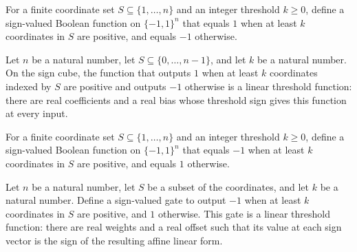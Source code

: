 \begin{definition}
\label{FABL.countThresholdGate}
\leanok
{}
For a finite coordinate set $S\subseteq\{1,\ldots,n\}$ and an integer threshold $k\ge
0$, define a sign-valued Boolean function on $\{−1,1\}^n$ that equals $1$ when at least
$k$ coordinates in $S$ are positive, and equals $−1$ otherwise.
\end{definition}

\begin{theorem}
\label{FABL.countThresholdGate_isLinearThreshold}
\leanok
{}
Let $n$ be a natural number, let $S\subseteq\{0,\ldots,n-1\}$, and let $k$ be a natural
number. On the sign cube, the function that outputs $1$ when at least $k$ coordinates
indexed by $S$ are positive and outputs $-1$ otherwise is a linear threshold function:
there are real coefficients and a real bias whose threshold sign gives this function at
every input.
\end{theorem}

\begin{definition}
\label{FABL.negCountThresholdGate}
\leanok
{}
For a finite coordinate set $S\subseteq\{1,\ldots,n\}$ and an integer threshold $k\ge
0$, define a sign-valued Boolean function on $\{−1,1\}^n$ that equals $−1$ when at least
$k$ coordinates in $S$ are positive, and equals $1$ otherwise.
\end{definition}

\begin{theorem}
\label{FABL.negCountThresholdGate_isLinearThreshold}
\leanok
{}
Let $n$ be a natural number, let $S$ be a subset of the coordinates, and let $k$ be a
natural number. Define a sign-valued gate to output $-1$ when at least $k$ coordinates
in $S$ are positive, and $1$ otherwise. This gate is a linear threshold function: there
are real weights and a real offset such that its value at each sign vector is the sign
of the resulting affine linear form.
\end{theorem}

